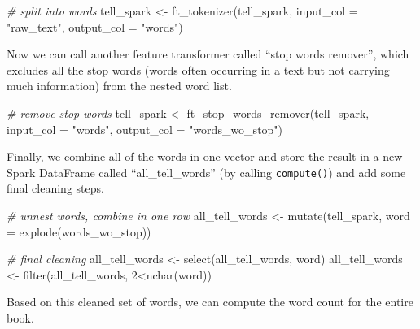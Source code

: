 \documentclass[
  12pt,
]{style/krantz}
\newenvironment{Shaded}{\begin{snugshade}}{\end{snugshade}}
\newcommand{\AttributeTok}[1]{\textcolor[rgb]{0.77,0.63,0.00}{#1}}
\newcommand{\CommentTok}[1]{\textcolor[rgb]{0.56,0.35,0.01}{\textit{#1}}}
\newcommand{\DecValTok}[1]{\textcolor[rgb]{0.00,0.00,0.81}{#1}}
\newcommand{\FunctionTok}[1]{\textcolor[rgb]{0.00,0.00,0.00}{#1}}
\newcommand{\NormalTok}[1]{#1}
\newcommand{\OtherTok}[1]{\textcolor[rgb]{0.56,0.35,0.01}{#1}}
\newcommand{\SpecialCharTok}[1]{\textcolor[rgb]{0.00,0.00,0.00}{#1}}
\newcommand{\StringTok}[1]{\textcolor[rgb]{0.31,0.60,0.02}{#1}}
\begin{document}
\begin{Shaded}
\begin{Highlighting}[]
\CommentTok{\# split into words}
\NormalTok{tell\_spark }\OtherTok{\textless{}{-}} \FunctionTok{ft\_tokenizer}\NormalTok{(tell\_spark, }
                           \AttributeTok{input\_col =} \StringTok{"raw\_text"}\NormalTok{,}
                           \AttributeTok{output\_col =} \StringTok{"words"}\NormalTok{)}
\end{Highlighting}
\end{Shaded}

Now we can call another feature transformer called ``stop words remover'', which excludes all the stop words (words often occurring in a text but not carrying much information) from the nested word list.

\begin{Shaded}
\begin{Highlighting}[]
\CommentTok{\# remove stop{-}words}
\NormalTok{tell\_spark }\OtherTok{\textless{}{-}} \FunctionTok{ft\_stop\_words\_remover}\NormalTok{(tell\_spark,}
                                    \AttributeTok{input\_col =} \StringTok{"words"}\NormalTok{,}
                                    \AttributeTok{output\_col =} \StringTok{"words\_wo\_stop"}\NormalTok{)}
\end{Highlighting}
\end{Shaded}

Finally, we combine all of the words in one vector and store the result in a new Spark DataFrame called ``all\_tell\_words'' (by calling \texttt{compute()}) and add some final cleaning steps.

\begin{Shaded}
\begin{Highlighting}[]
\CommentTok{\# unnest words, combine in one row}
\NormalTok{all\_tell\_words }\OtherTok{\textless{}{-}} \FunctionTok{mutate}\NormalTok{(tell\_spark, }
               \AttributeTok{word =} \FunctionTok{explode}\NormalTok{(words\_wo\_stop))}

\CommentTok{\# final cleaning}
\NormalTok{all\_tell\_words }\OtherTok{\textless{}{-}} \FunctionTok{select}\NormalTok{(all\_tell\_words, word)}
\NormalTok{all\_tell\_words }\OtherTok{\textless{}{-}} \FunctionTok{filter}\NormalTok{(all\_tell\_words, }\DecValTok{2}\SpecialCharTok{\textless{}}\FunctionTok{nchar}\NormalTok{(word))}
\end{Highlighting}
\end{Shaded}

Based on this cleaned set of words, we can compute the word count for the entire book.
\end{document}
